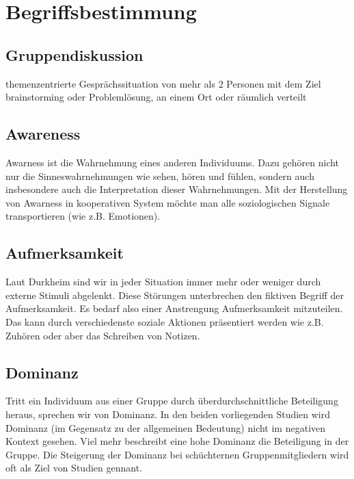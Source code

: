 \documentclass{seminarvorlage}
\begin{document}

\section{Begriffsbestimmung}
\subsection{Gruppendiskussion}
themenzentrierte Gesprächssituation von mehr als 2 Personen mit dem Ziel
brainstorming oder Problemlösung, an einem Ort oder räumlich verteilt

\subsection{Awareness}
Awarness ist die Wahrnehmung eines anderen Individuums. Dazu gehören nicht nur
die Sinneswahrnehmungen wie sehen, hören und fühlen, sondern auch insbesondere
auch die Interpretation dieser Wahrnehmungen. Mit der Herstellung von Awarness
in kooperativen System möchte man alle soziologischen Signale transportieren
(wie z.B. Emotionen).

\subsection{Aufmerksamkeit}
Laut Durkheim sind wir in jeder Situation immer mehr oder weniger durch externe
Stimuli abgelenkt. Diese Störungen unterbrechen den fiktiven Begriff der
Aufmerksamkeit. Es bedarf also einer Anstrengung Aufmerksamkeit mitzuteilen. Das
kann durch verschiedenste soziale Aktionen präsentiert werden wie z.B. Zuhören
oder aber das Schreiben von Notizen.

\subsection{Dominanz}
Tritt ein Individuum aus einer Gruppe durch überdurchschnittliche Beteiligung
heraus, sprechen wir von Dominanz. In den beiden vorliegenden Studien wird
Dominanz (im Gegensatz zu der allgemeinen Bedeutung) nicht im negativen Kontext
gesehen. Viel mehr beschreibt eine hohe Dominanz die Beteiligung in der Gruppe.
Die Steigerung der Dominanz bei schüchternen Gruppenmitgliedern wird oft als
Ziel von Studien gennant.
\end{document}

